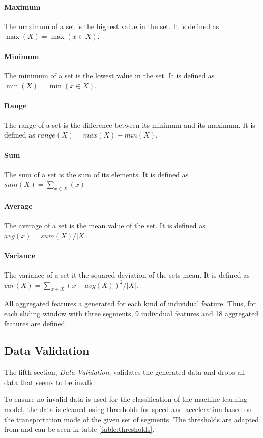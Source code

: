 \paragraph{Maximum} The maximum of a set is the highest value in the set. It is defined as $ \max (X) = \max(x \in X)$.

\paragraph{Minimum} The minimum of a set is the lowest value in the set. It is defined as $ \min (X) = \min (x \in X) $.

\paragraph{Range} The range of a set is the difference between its minimum and its maximum. It is defined as $ range(X) = max(X) - min(X)$.  

\paragraph{Sum} The sum of a set is the sum of its elements. It is defined as $sum(X) = \sum_{x\in X} (x)$

\paragraph{Average} The average of a set is the mean value of the set. It is defined as $ avg (x) = sum(X)/|X|$.

\paragraph{Variance} The variance of a set it the squared deviation of the sets mean. It is defined as $var (X) = \sum_{x\in X} (x - avg(X))^2/|X| $.  

All aggregated features a generated for each kind of individual feature. Thus, for each sliding window with three segments, 9 individual features and 18 aggregated features are defined. 

\subsection{Data Validation}
The fifth section, \textit{Data Validation}, validates the generated data and drops all data that seems to be invalid.

To ensure no invalid data is used for the classification of the machine learning model, the data is cleaned using thresholds for speed and acceleration based on the transportation mode of the given set of segments. The thresholds are adapted from \cite{Dabiri2018} and can be seen in table \ref{table:thresholds}.
 
